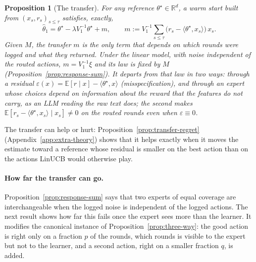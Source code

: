 \documentclass{article}
\newtheorem{proposition}{Proposition}
\theoremstyle{definition}
\theoremstyle{remark}
\newcommand{\R}{\mathbb{R}}
\newcommand{\E}{\mathbb{E}}
\theoremstyle{remark}
\begin{document}
\begin{proposition}[The transfer]
\label{prop:transfer}
For any reference $\theta^\star\in\R^d$, a warm start built from
$(x_s,r_s)_{s\le\tau}$ satisfies, exactly,
\[
\widehat\theta_1=\theta^\star-\lambda V_1^{-1}\theta^\star+m,
\qquad
m:=V_1^{-1}\sum_{s\le\tau}\bigl(r_s-\langle\theta^\star,x_s\rangle\bigr)\,x_s .
\]
Given $M$, the \emph{transfer} $m$ is the only term that depends on which
rounds were logged and what they returned. Under the linear model, with noise
independent of the routed actions, $m=V_1^{-1}\xi$ and its law is fixed by $M$
(Proposition~\ref{prop:response-sum}). It departs from that law in two ways:
through a residual $\varepsilon(x)=\E[r\mid x]-\langle\theta^\star,x\rangle$
(misspecification), and through an expert whose choices depend on information
about the reward that the features do not carry, as an LLM reading the raw
text does; the second makes
$\E[r_s-\langle\theta^\star,x_s\rangle\mid x_s]\ne0$ on the routed rounds even
when $\varepsilon\equiv0$.
\end{proposition}

The transfer can help or hurt: Proposition~\ref{prop:transfer-regret}
(Appendix~\ref{app:extra-theory}) shows that it helps exactly when it moves the
estimate toward a reference whose residual is smaller on the best action than
on the actions LinUCB would otherwise play.

\paragraph{How far the transfer can go.}
Proposition~\ref{prop:response-sum} says that two experts of equal coverage
are interchangeable when the logged noise is independent of the logged
actions. The next result shows how far this fails once the expert sees more
than the learner. It modifies the canonical instance of
Proposition~\ref{prop:three-way}: the good action is right only on a fraction
$p$ of the rounds, which rounds is visible to the expert but not to the
learner, and a second action, right on a smaller fraction $q$, is added.
\end{document}
